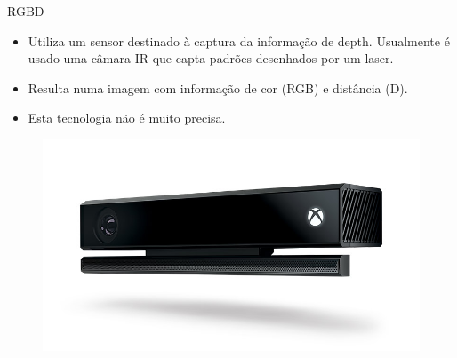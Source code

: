 \begin{frame}{RGBD}
			
	\begin{minipage}{0.5\textwidth}
		\begin{itemize}
			\item Utiliza um sensor destinado à captura da informação de depth. Usualmente é usado uma câmara IR que capta padrões desenhados por um laser.
			\item Resulta numa imagem com informação de cor (RGB) e distância (D).
			\item Esta tecnologia não é muito precisa.
		\end{itemize}
	\end{minipage}%
	\begin{minipage}{0.5\textwidth}
		\begin{figure}
			\includegraphics[width=.9\textwidth]{img/kinect.jpg}
		\end{figure}
	\end{minipage}
						
\end{frame}

